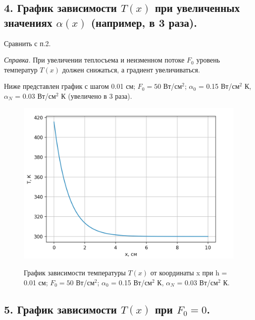 \documentclass[a4paper,12pt]{article}
\begin{document}
	\newpage
	
	\subsection*{4. График зависимости $T(x)$ при увеличенных значениях $\alpha(x)$ (например, в 3 раза). }
	
	Сравнить с п.2.
	
	\begin{center}
		\textit{Справка}. При увеличении теплосъема и неизменном потоке $F_0$ уровень температур $T(x)$ должен снижаться, а градиент увеличиваться.
	\end{center}

	Ниже представлен график с шагом 0.01 см; $F_0 = 50$ Вт/см$^2$; $\alpha_0$ = 0.15 Вт/см$^2$ К, $\alpha_N$ = 0.03 Вт/см$^2$ К (увеличено в 3 раза).
	
	\begin{figure}[h!]
		\begin{center}
			{\includegraphics[scale = 0.7]{3.png}}
			\label{ris:3}
		\end{center}
		\caption{График зависимости температуры $T(x)$ от координаты x при h = 0.01 см; $F_0 = 50$ Вт/см$^2$; $\alpha_0$ = 0.15 Вт/см$^2$ К, $\alpha_N$ = 0.03 Вт/см$^2$ К.}
	\end{figure}
	
	\newpage
	
	\subsection*{5. График зависимости $T(x)$ при $F_0 = 0$.}
	
\end{document}
